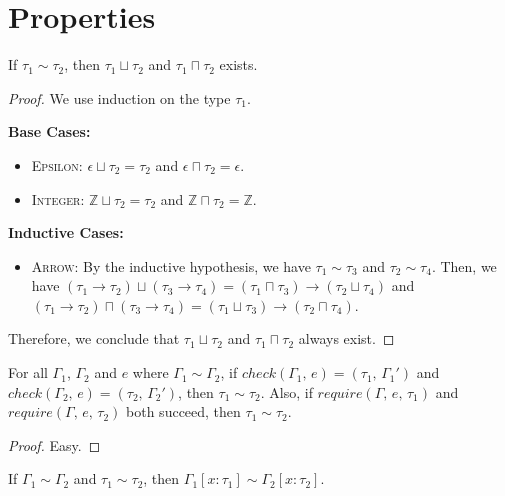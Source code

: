 \documentclass[peerreview, 10pt]{IEEEtran}
\newcommand{\Z}{\ensuremath{\mathbb{Z}}}
\newcommand{\arrowt}[2]{\ensuremath{{#1}\rightarrow{#2}}}
\newcommand{\checktype}[4]{\ensuremath{{check}(#1,\,#2)=(#3,\,#4)}}
\begin{document}
\section*{Properties}

\begin{lemma}
    \label{lem:bound}
    If $\tau_1\sim\tau_2$, then $\tau_1\sqcup\tau_2$ and $\tau_1\sqcap\tau_2$ exists.
\end{lemma}

\begin{proof}
    We use induction on the type $\tau_1$.

    \textbf{Base Cases:}
    \begin{itemize}
        \item \textsc{Epsilon}: $\epsilon\sqcup\tau_2=\tau_2$ and $\epsilon\sqcap\tau_2=\epsilon$.
        \item \textsc{Integer}: $\Z\sqcup\tau_2=\tau_2$ and $\Z\sqcap\tau_2=\Z$.
    \end{itemize}

    \textbf{Inductive Cases:}
    \begin{itemize}
        \item \textsc{Arrow}: By the inductive hypothesis, we have $\tau_1\sim\tau_3$ and $\tau_2\sim\tau_4$. Then, we have $(\arrowt{\tau_1}{\tau_2})\sqcup(\arrowt{\tau_3}{\tau_4})=\arrowt{(\tau_1\sqcap\tau_3)}{(\tau_2\sqcup\tau_4)}$ and $(\arrowt{\tau_1}{\tau_2})\sqcap(\arrowt{\tau_3}{\tau_4})=\arrowt{(\tau_1\sqcup\tau_3)}{(\tau_2\sqcap\tau_4)}$.
    \end{itemize}

    Therefore, we conclude that $\tau_1\sqcup\tau_2$ and $\tau_1\sqcap\tau_2$ always exist.
\end{proof}

\begin{lemma}
    \label{lem:same-kind}
    For all $\Gamma_1$, $\Gamma_2$ and $e$ where $\Gamma_1\sim\Gamma_2$, if $\checktype{\Gamma_1}{e}{\tau_1}{\Gamma_1'}$ and $\checktype{\Gamma_2}{e}{\tau_2}{\Gamma_2'}$, then $\tau_1\sim\tau_2$. Also, if $require(\Gamma,\,e,\,\tau_1)$ and $require(\Gamma,\,e,\,\tau_2)$ both succeed, then $\tau_1\sim\tau_2$.
\end{lemma}

\begin{proof}
    Easy.
\end{proof}

\begin{lemma}
    \label{lem:env-kind}
    If $\Gamma_1\sim\Gamma_2$ and $\tau_1\sim\tau_2$, then $\Gamma_1[x:\tau_1]\sim\Gamma_2[x:\tau_2]$.
\end{lemma}
\end{document}
